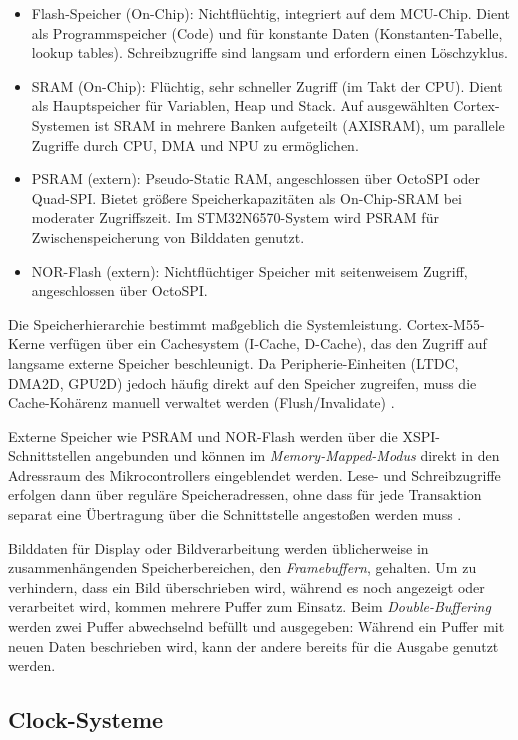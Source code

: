 \begin{itemize}
    \item Flash-Speicher (On-Chip): Nichtflüchtig, integriert auf dem MCU-Chip. Dient als Programmspeicher (Code) und für konstante Daten (Konstanten-Tabelle, lookup tables). Schreibzugriffe sind langsam und erfordern einen Löschzyklus.
    \item SRAM (On-Chip): Flüchtig, sehr schneller Zugriff (im Takt der CPU). Dient als Hauptspeicher für Variablen, Heap und Stack. Auf ausgewählten Cortex-Systemen ist SRAM in mehrere Banken aufgeteilt (AXISRAM), um parallele Zugriffe durch CPU, DMA und NPU zu ermöglichen.
    \item PSRAM (extern): Pseudo-Static RAM, angeschlossen über OctoSPI oder Quad-SPI. Bietet größere Speicherkapazitäten als On-Chip-SRAM bei moderater Zugriffszeit. Im STM32N6570-System wird PSRAM für Zwischenspeicherung von Bilddaten genutzt.
    \item NOR-Flash (extern): Nichtflüchtiger Speicher mit seitenweisem Zugriff, angeschlossen über OctoSPI.
\end{itemize}

Die Speicherhierarchie bestimmt maßgeblich die Systemleistung. Cortex-M55-Kerne verfügen über ein Cachesystem (I-Cache, D-Cache), das den Zugriff auf langsame externe Speicher beschleunigt. Da Peripherie-Einheiten (LTDC, DMA2D, GPU2D) jedoch häufig direkt auf den Speicher zugreifen, muss die Cache-Kohärenz manuell verwaltet werden (Flush/Invalidate) \cite[S. ~308ff.]{rm0486}.

Externe Speicher wie PSRAM und NOR-Flash werden über die XSPI-Schnittstellen angebunden und können im \textit{Memory-Mapped-Modus} direkt in den Adressraum des Mikrocontrollers eingeblendet werden. Lese- und Schreibzugriffe erfolgen dann über reguläre Speicheradressen, ohne dass für jede Transaktion separat eine Übertragung über die Schnittstelle angestoßen werden muss \cite[S. 1288]{rm0486}.

Bilddaten für Display oder Bildverarbeitung werden üblicherweise in zusammenhängenden Speicherbereichen, den \textit{Framebuffern}, gehalten. Um zu verhindern, dass ein Bild überschrieben wird, während es noch angezeigt oder verarbeitet wird, kommen mehrere Puffer zum Einsatz. Beim \textit{Double-Buffering} werden zwei Puffer abwechselnd befüllt und ausgegeben: Während ein Puffer mit neuen Daten beschrieben wird, kann der andere bereits für die Ausgabe genutzt werden.

\subsection{Clock-Systeme}\label{sub:clock-systeme}

